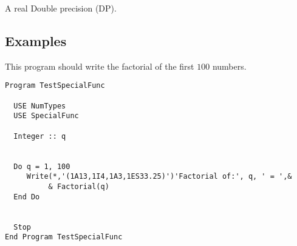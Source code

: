 A real Double precision (DP).

\subsection{Examples}

This program should write the factorial of the first $100$ numbers.

\begin{lstlisting}[emph=Factorial,
                   emphstyle=\color{blue},
                   frame=trBL,
                   caption=Computing the factorial.,
                   label=gammaln]
Program TestSpecialFunc

  USE NumTypes
  USE SpecialFunc

  Integer :: q


  Do q = 1, 100
     Write(*,'(1A13,1I4,1A3,1ES33.25)')'Factorial of:', q, ' = ',&
          & Factorial(q)
  End Do


  Stop
End Program TestSpecialFunc
\end{lstlisting}


